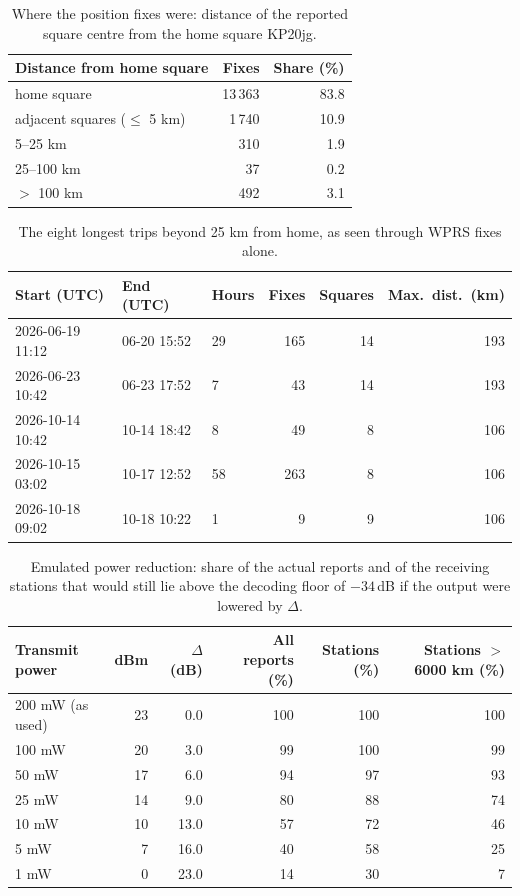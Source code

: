 \begin{table}[htbp]\centering\small
\caption{Where the position fixes were: distance of the reported square centre from the home square KP20jg.}\label{tab:wdist}
\begin{tabular}{lrr}
\toprule
Distance from home square & Fixes & Share (\%) \\
\midrule
home square & 13\,363 & 83.8 \\
adjacent squares ($\leq$ 5 km) & 1\,740 & 10.9 \\
5--25 km & 310 & 1.9 \\
25--100 km & 37 & 0.2 \\
$>$ 100 km & 492 & 3.1 \\
\bottomrule
\end{tabular}
\end{table}

\begin{table}[htbp]\centering\small
\caption{The eight longest trips beyond 25 km from home, as seen through WPRS fixes alone.}\label{tab:wtrips}
\begin{tabular}{lllrrr}
\toprule
Start (UTC) & End (UTC) & Hours & Fixes & Squares & Max.\ dist.\ (km) \\
\midrule
2026-06-19 11:12 & 06-20 15:52 & 29 & 165 & 14 & 193 \\
2026-06-23 10:42 & 06-23 17:52 & 7 & 43 & 14 & 193 \\
2026-10-14 10:42 & 10-14 18:42 & 8 & 49 & 8 & 106 \\
2026-10-15 03:02 & 10-17 12:52 & 58 & 263 & 8 & 106 \\
2026-10-18 09:02 & 10-18 10:22 & 1 & 9 & 9 & 106 \\
\bottomrule
\end{tabular}
\end{table}

\begin{table}[htbp]\centering\small
\caption{Emulated power reduction: share of the actual reports and of the receiving stations that would still lie above the decoding floor of $-34$\,dB if the output were lowered by $\Delta$.}\label{tab:wpower}
\begin{tabular}{lrrrrr}
\toprule
Transmit power & dBm & $\Delta$ (dB) & All reports (\%) & Stations (\%) & Stations $>$ 6000 km (\%) \\
\midrule
200 mW (as used) & 23 & 0.0 & 100 & 100 & 100 \\
100 mW & 20 & 3.0 & 99 & 100 & 99 \\
50 mW & 17 & 6.0 & 94 & 97 & 93 \\
25 mW & 14 & 9.0 & 80 & 88 & 74 \\
10 mW & 10 & 13.0 & 57 & 72 & 46 \\
5 mW & 7 & 16.0 & 40 & 58 & 25 \\
1 mW & 0 & 23.0 & 14 & 30 & 7 \\
\bottomrule
\end{tabular}
\end{table}

